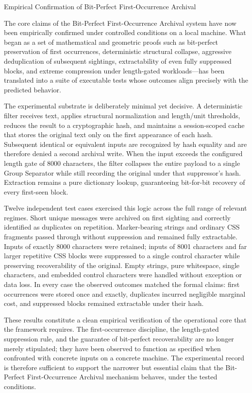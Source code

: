 Empirical Confirmation of Bit-Perfect First-Occurrence Archival

The core claims of the Bit-Perfect First-Occurrence Archival system have now been empirically confirmed under controlled conditions on a local machine. What began as a set of mathematical and geometric proofs such as bit-perfect preservation of first occurrences, deterministic structural collapse, aggressive deduplication of subsequent sightings, extractability of even fully suppressed blocks, and extreme compression under length-gated workloads—has been translated into a suite of executable tests whose outcomes align precisely with the predicted behavior.

The experimental substrate is deliberately minimal yet decisive. A deterministic filter receives text, applies structural normalization and length/unit thresholds, reduces the result to a cryptographic hash, and maintains a session-scoped cache that stores the original text only on the first appearance of each hash. Subsequent identical or equivalent inputs are recognized by hash equality and are therefore denied a second archival write. When the input exceeds the configured length gate of 8000 characters, the filter collapses the entire payload to a single Group Separator while still recording the original under that suppressor’s hash. Extraction remains a pure dictionary lookup, guaranteeing bit-for-bit recovery of every first-seen block.

Twelve independent test cases exercised this logic across the full range of relevant regimes. Short unique messages were archived on first sighting and correctly identified as duplicates on repetition. Marker-bearing strings and ordinary CSS fragments passed through without suppression and remained fully extractable. Inputs of exactly 8000 characters were retained; inputs of 8001 characters and far larger repetitive CSS blocks were suppressed to a single control character while preserving recoverability of the original. Empty strings, pure whitespace, single characters, and embedded control characters were handled without exception or data loss. In every case the observed outcomes matched the formal claims: first occurrences were stored once and exactly, duplicates incurred negligible marginal cost, and suppressed blocks remained extractable under their hash.

These results constitute a clean empirical verification of the operational core that the framework requires. The first-occurrence discipline, the length-gated suppression rule, and the guarantee of bit-perfect recoverability are no longer merely stipulated; they have been observed to function as specified when confronted with concrete inputs on a concrete machine. The experimental record is therefore sufficient to support the narrower but essential claim that the Bit-Perfect First-Occurrence Archival mechanism behaves, under the tested conditions.

